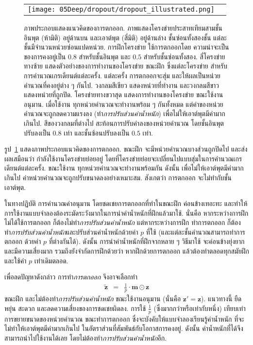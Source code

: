 %
\begin{figure}
	\begin{center}
		\begin{tabular}{cc}
			\texttt{[image: 05Deep/dropout/dropout\_illustrated.png]}	
		\end{tabular}		
		\caption[ภาพประกอบแสดงแนวคิดของการตกออก]{ภาพประกอบแสดงแนวคิดของการตกออก.
		ภาพแสดงโครงข่ายประสาทเทียมสามชั้น อินพุต (ห้ามิติ) อยู่ด้านบน และเอาต์พุต (สี่มิติ) อยู่ด้านล่าง ชั้นซ่อนทั้งสองชั้น แต่ละชั้นมีจำนวนหน่วยซ่อนแปดหน่วย.
		การฝึกโครงข่าย ใช้การตกออกโดย ความน่าจะเป็นของการคงอยู่เป็น $0.8$ สำหรับชั้นอินพุต และ $0.5$ สำหรับชั้นซ่อนทั้งสอง.
สี่โครงข่ายทางซ้าย แสดงตัวอย่างของการทำงานของโครงข่าย ขณะฝึก
ซึ่งแต่ละโครงข่าย สำหรับการคำนวณเกรเดียนต์แต่ละครั้ง.
แต่ละครั้ง การตกออกจะสุ่ม และให้ผลเป็นหน่วยคำนวณที่คงอยู่ต่าง ๆ  กันไป.
วงกลมสีเขียว แสดงหน่วยที่ทำงาน และวงกลมสีขาว แสดงหน่วยที่ถูกปิด.
โครงข่ายทางขวาสุด แสดงการทำงานของโครงข่าย ขณะใช้งานอนุมาน.
เมื่อใช้งาน ทุกหน่วยคำนวณจะทำงานพร้อม ๆ กันทั้งหมด แต่ค่าของหน่วยคำนวณจะถูกลดความแรงลง (ทำ\textit{การปรับส่วนค่าน้ำหนัก}) เพื่อไม่ให้เอาต์พุตมีค่ามากเกินไป.
สีของวงกลมที่ต่างไป สะท้อนการปรับค่าลงของหน่วยคำนวณ โดยชั้นอินพุตปรับลงเป็น $0.8$ เท่า และชั้นซ้อนปรับลงเป็น $0.5$ เท่า.}
		\label{fig: dropout}
	\end{center}
\end{figure}
%

รูป~\ref{fig: dropout} 
แสดงภาพประกอบแนวคิดของการตกออก.
ขณะฝึก จะมีหน่วยคำนวณบางส่วนถูกปิดไป และส่งผลเสมือนว่า 
กำลังใช้งานโครงข่ายย่อยอยู่
โดยที่โครงข่ายย่อยจะเปลี่ยนไปแบบสุ่มในการคำนวณเกรเดียนต์แต่ละครั้ง.
ขณะใช้งาน ทุกหน่วยคำนวณจะทำงานพร้อมกัน ดังนั้น เพื่อไม่ให้เอาต์พุตมีค่ามากเกินไป
ค่าหน่วยคำนวณจะถูกปรับขนาดลงอย่างเหมาะสม.
สังเกตว่า  การตกออก จะไม่ทำกับชั้นเอาต์พุต.

ในทางปฏิบัติ
การคำนวณค่าอนุมาน โดยชดเชยการตกออกที่ทำในขณะฝึก 
ค่อนข้างเทอะทะ และทำให้การใช้งานแบบจำลองต้องระมัดระวังมากในการนำค่าน้ำหนักที่ฝึกแล้วมาใช้.
นั่นคือ หากระหว่างการฝึก ไม่ได้ใช้การตกออก ก็ต้องไม่ทำ\textit{การปรับส่วนค่าน้ำหนัก}
แต่หากระหว่างการฝึก ทำการตกออก ก็ต้องทำ\textit{การปรับส่วนค่าน้ำหนัก}และปรับส่วนค่าน้ำหนักด้วยค่า $p$ ที่ใช้ (และแต่ละชั้นคำนวณสามารถทำการตกออก ด้วยค่า $p$ ที่ต่างกันได้).
ดังนั้น การนำค่าน้ำหนักที่ฝึกจากหลาย ๆ วิธีมาใช้ จะค่อนข้างยุ่งยากและมีความเสี่ยงมาก
รวมถึงยังจำกัดการฝึกด้วยว่า หากฝึกด้วยการตกออก แล้วต้องทำตลอดทุกสมัยฝึก และใช้ค่า $p$ เท่าเดิมตลอด.

เพื่อลดปัญหาดังกล่าว
การทำ\textit{การตกออก} จึงอาจเลือกทำ
\begin{eqnarray}
\tilde{\bm{z}}
&=& \frac{1}{p} \cdot \bm{m} \odot \bm{z}
\label{eq: drop out 2} 
\end{eqnarray}
ขณะฝึก
และไม่ต้องทำ\textit{การปรับส่วนค่าน้ำหนัก} ขณะใช้งานอนุมาน (นั่นคือ $\bm{z}' = \bm{z}$).
แนวทางนี้ ยืดหยุ่น สะดวก และลดความเสี่ยงของการชดเชยผิดลง.
การใช้ $\frac{1}{p}$ (ซึ่งมากกว่าหรือเท่ากับหนึ่ง)
เทียบเท่าการขยายขนาดของหน่วยคำนวณ ขณะทำการตกออก
ซึ่งจะบังคับให้แบบจำลองเรียนรู้ค่าน้ำหนัก ที่จะไม่ทำให้เอาต์พุตมีค่ามากเกินไป
ในอัตราส่วนที่สัมพันธ์กับโอกาสการคงอยู่.
ดังนั้น ค่าน้ำหนักที่ได้จึงสามารถนำไปใช้งานได้เลย โดยไม่ต้องทำ\textit{การปรับส่วนค่าน้ำหนัก}อีก.

